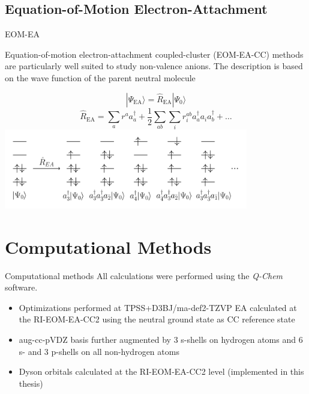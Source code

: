 \documentclass[9pt,t,xcolor=table]{beamer}
\begin{document}
\subsection{Equation-of-Motion Electron-Attachment}
\begin{frame}{\huge EOM-EA}\large
	\begin{flushleft}
    Equation-of-motion electron-attachment coupled-cluster (EOM-EA-CC) methods are particularly well suited to study non-valence anions.
	The description is based on the wave function of the parent neutral molecule
	\end{flushleft}
	\centering
	\vspace{-2pt}
	    \[ |\Psi_{\mathrm{EA}} \rangle = \hat{R}_{\mathrm{EA}} | \Psi_0 \rangle \]
	\vspace{1pt}
		\[ \hat{R}_{\mathrm{EA}} = \sum_{a} r^a a_a^\dagger + \frac{1}{2} \sum_{ab} \sum_{i} r_{i}^{ab} a_a^\dagger a_i a_b^\dagger + \dots \]
	\includegraphics[width=0.8\textwidth]{Figs/EOM_EA.pdf}
	\vspace{3pt}
\end{frame}

\section{Computational Methods}
\begin{frame}{\huge Computational methods}\large
	All calculations were performed using the \textit{Q-Chem} software.
	\begin{itemize}
		\item Optimizations performed at TPSS+D3BJ/ma-def2-TZVP
		EA calculated at the RI-EOM-EA-CC2 using the neutral ground state as CC reference state
		\item aug-cc-pVDZ basis further augmented by 3 s-shells on hydrogen atoms and 6 s- and 3 p-shells on all non-hydrogen atoms
		\item Dyson orbitals calculated at the RI-EOM-EA-CC2 level (implemented in this thesis)
	\end{itemize}
	\vfill
	\centering
	\vfill
\end{frame}
\end{document}
